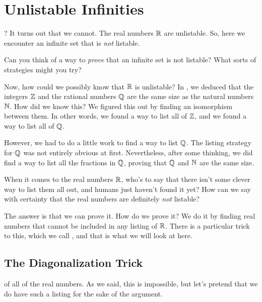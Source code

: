 \documentclass[../../../main.tex]{subfiles}
\begin{document}
\chapter{Unlistable Infinities}
\label{ch:unlistable-infinities}

? It turns out that we cannot. The real numbers $\Reals/$ are unlistable. So, here we encounter an infinite set that is \emph{not} listable.

\begin{ponder}
  Can you think of a way to \emph{prove} that an infinite set is not listable? What sorts of strategies might you try?
\end{ponder}

Now, how could we possibly know that $\Reals/$ is unlistable? In , we deduced that the integers $\Ints/$ and the rational numbers $\Rationals/$ are the same size as the natural numbers $\Nats/$. How did we know this? We figured this out by finding an isomorphism between them. In other words, we found a way to list all of $\Ints/$, and we found a way to list all of $\Rationals/$. 

However, we had to do a little work to find a way to list $\Rationals/$. The listing strategy for $\Rationals/$ was not entirely obvious at first. Nevertheless, after some thinking, we did find a way to list all the fractions in $\Rationals/$, proving that $\Rationals/$ and $\Nats/$ are the same size. 

When it comes to the real numbers $\Reals/$, who's to say that there isn't some clever way to list them all out, and humans just haven't found it yet? How can we say with certainty that the real numbers are definitely \emph{not} listable? 

The answer is that we can prove it. How do we prove it? We do it by finding real numbers that cannot be included in any listing of $\Reals/$. There is a particular trick to this, which we call , and that is what we will look at here.


\section{The Diagonalization Trick}

 of all of the real numbers. As we said, this is impossible, but let's pretend that we do have such a listing for the sake of the argument. 
\end{document}
